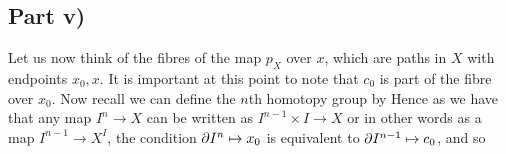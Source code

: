 \documentclass{article}
\begin{document}
\subsection{Part v)}
Let us now think of the fibres of the map $p_X$ over $x$, which are paths in $X$ with endpoints $x_0,x$. It is important at this point to note that $c_0$ is part of the fibre over $x_0$. Now recall we can define the $n$th homotopy group by 
Hence as we have that any map $I^n \to X$ can be written as $I^{n-1}\times I \to X$ or in other words as a map $I^{n-1} \to X^I$, the condition $\partial I^n \mapsto x_0$ is equivalent to $\partial I^{n-1} \mapsto c_0$, and so 
\end{document}
